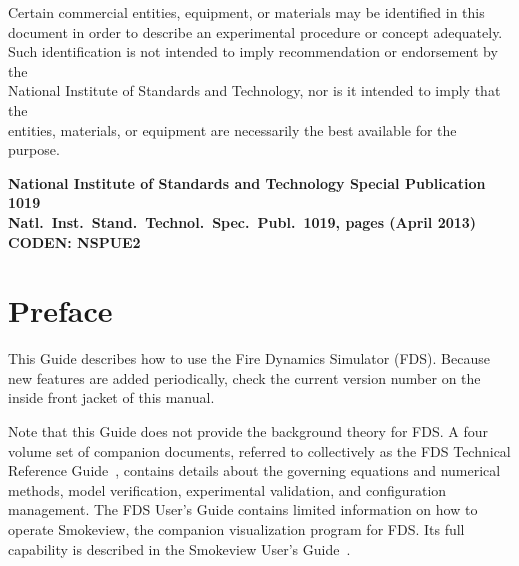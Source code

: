 \documentclass[11pt]{book}
\begin{document}
\begin{minipage}[t][9in][s]{6.25in}

\begin{flushright}
Certain commercial entities, equipment, or materials may be identified in this \\
document in order to describe an experimental procedure or concept adequately. \\
Such identification is not intended to imply recommendation or endorsement by the \\
National Institute of Standards and Technology, nor is it intended to imply that the \\
entities, materials, or equipment are necessarily the best available for the purpose.
\end{flushright}

\vspace{3in}

\large
\begin{flushright}
{\bf National Institute of Standards and Technology Special Publication 1019 \\
Natl.~Inst.~Stand.~Technol.~Spec.~Publ.~1019, \pageref{LastPage} pages (April 2013) \\
CODEN: NSPUE2 }
\end{flushright}

\vfill

\hspace{1in}

\end{minipage}

\clearpage

\frontmatter

\pagestyle{plain}




\chapter{Preface}

This Guide describes how to use the Fire Dynamics Simulator (FDS). Because new features are added periodically, check
the current version number on the inside front jacket of this manual.

Note that this Guide does not provide the background theory for FDS. A four volume set of companion documents, referred to
collectively as the FDS Technical Reference Guide~\cite{FDS_Math_Guide}, contains details about the governing
equations and numerical methods, model verification, experimental validation, and configuration management.
The FDS User's Guide contains limited information on how to operate Smokeview, the companion
visualization program for FDS. Its full capability is described in the Smokeview User's Guide~\cite{Smokeview_Users_Guide}.
\end{document}
